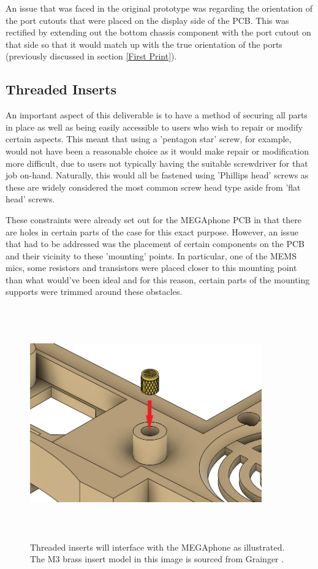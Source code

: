 An issue that was faced in the original prototype was regarding the orientation of the port cutouts that were placed on the display side of the PCB.
This was rectified by extending out the bottom chassis component with the port cutout on that side so that it would match up with the true orientation of the ports (previously discussed in section \ref{First Print}). %

\subsection{Threaded Inserts} \label{Threaded}

An important aspect of this deliverable is to have a method of securing all parts in place as well as being easily accessible to users who wish to repair or modify certain aspects.
This meant that using a 'pentagon star' screw, for example, would not have been a reasonable choice as it would make repair or modification more difficult, due to users not typically having the suitable screwdriver for that job on-hand.
Naturally, this would all be fastened using 'Phillips head' screws as these are widely considered the most common screw head type aside from 'flat head' screws.

These constraints were already set out for the MEGAphone PCB in that there are holes in certain parts of the case for this exact purpose.
However, an issue that had to be addressed was the placement of certain components on the PCB and their vicinity to these 'mounting' points.
In particular, one of the MEMS mics, some resistors and transistors were placed closer to this mounting point than what would've been ideal and for this reason, certain parts of the mounting supports were trimmed around these obstacles.

\begin{figure} [h]
    \centering
    \includegraphics[width=10cm,height=10cm,keepaspectratio]{Figures/threaded_insert.png}
    \caption{Threaded inserts will interface with the MEGAphone as illustrated. The M3 brass insert model in this image is sourced from Grainger \cite{insert}.}
    \label{fig:Threads}
\end{figure}

